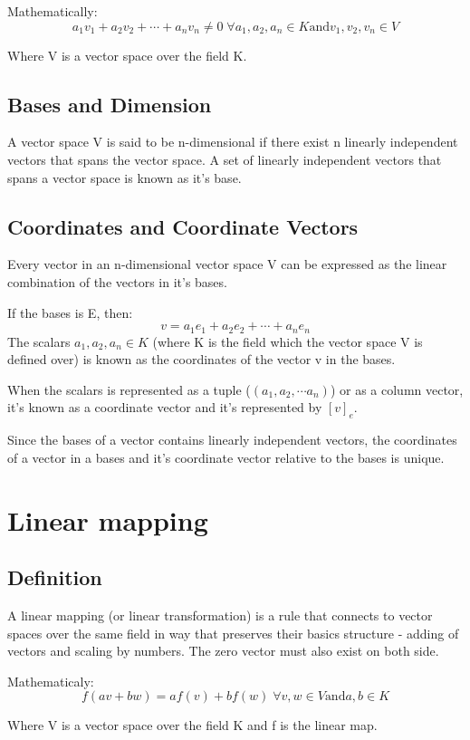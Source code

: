 \documentclass{book}
\begin{document}
Mathematically:
\[a_1 v_1 + a_2 v_2 + \cdots + a_n v_n \neq 0 \; \forall a_1, a_2, a_n \in K \text{and} v_1, v_2, v_n \in V\]

Where V is a vector space over the field K.

\section{Bases and Dimension}
A vector space V is said to be n-dimensional if there exist n linearly independent vectors that spans the vector space. A set of linearly independent vectors that spans a vector space is known as it's base.

\section{Coordinates and Coordinate Vectors}
Every vector in an n-dimensional vector space V can be expressed as the linear combination of the vectors in it's bases.

If the bases is E, then:
\[v = a_1 e_1 + a_2 e_2 + \cdots + a_n e_n\]
The scalars \(a_1, a_2, a_n \in K\) (where K is the field which the vector space V is defined over) is known as the coordinates of the vector v in the bases.

When the scalars is represented as a tuple (\((a_1, a_2, \cdots a_n)\)) or as a column vector, it's known as a coordinate vector and it's represented by \([v]_e\).

Since the bases of a vector contains linearly independent vectors, the coordinates of a vector in a bases and it's coordinate vector relative to the bases is unique.

\chapter{Linear mapping}
\section{Definition}
A linear mapping (or linear transformation) is a rule that connects to vector spaces over the same field in way that preserves	their basics structure {-} adding of vectors and scaling by numbers. The zero vector must also exist on both side.

Mathematicaly:
\[f(av + bw) = a f(v) + b f(w) \; \forall v, w \in V \text{and} a, b \in K\]

Where V is a vector space over the field K and f is the linear map.
\end{document}
